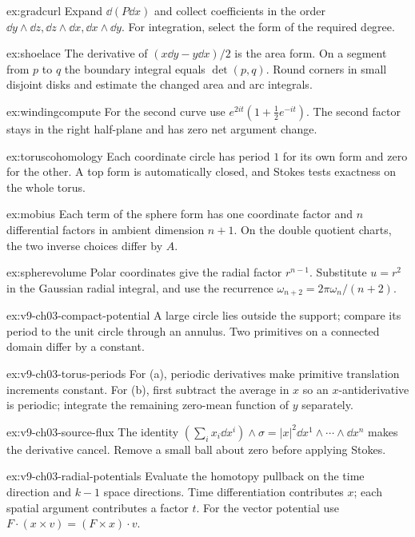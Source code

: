 \begin{hint}{ex:gradcurl}
Expand $\dd(P\dd x)$ and collect coefficients in the order $\dd y\wedge\dd z,\dd z\wedge\dd x,\dd x\wedge\dd y$. For integration, select the form of the required degree.
\end{hint}
\begin{hint}{ex:shoelace}
The derivative of $(x\dd y-y\dd x)/2$ is the area form. On a segment from $p$ to $q$ the boundary integral equals $\det(p,q)$. Round corners in small disjoint disks and estimate the changed area and arc integrals.
\end{hint}
\begin{hint}{ex:windingcompute}
For the second curve use $e^{2it}(1+\tfrac12e^{-it})$. The second factor stays in the right half-plane and has zero net argument change.
\end{hint}
\begin{hint}{ex:toruscohomology}
Each coordinate circle has period $1$ for its own form and zero for the other. A top form is automatically closed, and Stokes tests exactness on the whole torus.
\end{hint}
\begin{hint}{ex:mobius}
Each term of the sphere form has one coordinate factor and $n$ differential factors in ambient dimension $n+1$. On the double quotient charts, the two inverse choices differ by $A$.
\end{hint}
\begin{hint}{ex:spherevolume}
Polar coordinates give the radial factor $r^{n-1}$. Substitute $u=r^2$ in the Gaussian radial integral, and use the recurrence $\omega_{n+2}=2\pi\omega_n/(n+2)$.
\end{hint}
\begin{hint}{ex:v9-ch03-compact-potential}
A large circle lies outside the support; compare its period to the unit circle through an annulus. Two primitives on a connected domain differ by a constant.
\end{hint}
\begin{hint}{ex:v9-ch03-torus-periods}
For (a), periodic derivatives make primitive translation increments constant. For (b), first subtract the average in $x$ so an $x$-antiderivative is periodic; integrate the remaining zero-mean function of $y$ separately.
\end{hint}
\begin{hint}{ex:v9-ch03-source-flux}
The identity $(\sum_i x_i\dd x^i)\wedge\sigma=|x|^2\dd x^1\wedge\cdots\wedge\dd x^n$ makes the derivative cancel. Remove a small ball about zero before applying Stokes.
\end{hint}
\begin{hint}{ex:v9-ch03-radial-potentials}
Evaluate the homotopy pullback on the time direction and $k-1$ space directions. Time differentiation contributes $x$; each spatial argument contributes a factor $t$. For the vector potential use $F\cdot(x\times v)=(F\times x)\cdot v$.
\end{hint}

